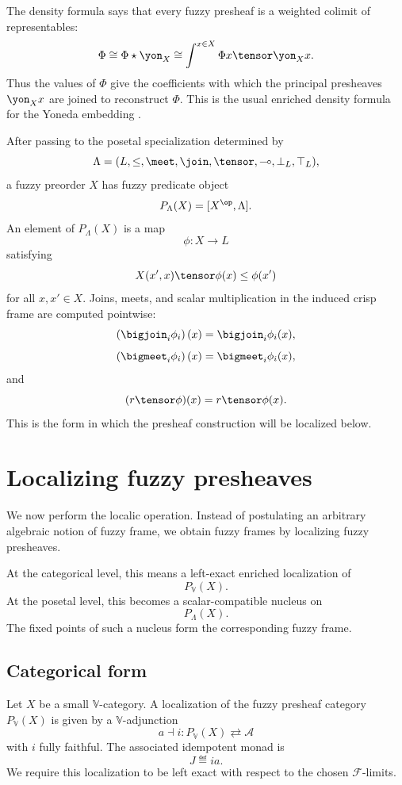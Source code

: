 The density formula says that every fuzzy presheaf is a weighted colimit of
representables:
\[
    \Phi
    \cong
    \Phi\star\yon_X
    \cong
    \int^{x\in X}\Phi x\tensor\yon_Xx.
\]
Thus the values of \(\Phi\) give the coefficients with which the principal presheaves
\(\yon_Xx\) are joined to reconstruct \(\Phi\). This is the usual enriched density
formula for the Yoneda embedding \cite{Kelly1982BasicConcepts}.

After passing to the posetal specialization determined by
\[
    \Lambda=(L,\leq,\meet,\join,\tensor,\multimap,\bot_L,\top_L),
\]
a fuzzy preorder \(X\) has fuzzy predicate object
\[
    P_\Lambda(X)
    =
    [X^{\op},\Lambda].
\]
An element of \(P_\Lambda(X)\) is a map
\[
    \phi:X\to L
\]
satisfying
\[
    X(x',x)\tensor\phi(x)\leq \phi(x')
\]
for all \(x,x'\in X\). Joins, meets, and scalar multiplication in the induced crisp
frame are computed pointwise:
\[
    \left(\bigjoin_i\phi_i\right)(x)
    =
    \bigjoin_i\phi_i(x),
\]
\[
    \left(\bigmeet_i\phi_i\right)(x)
    =
    \bigmeet_i\phi_i(x),
\]
and
\[
    (r\tensor\phi)(x)
    =
    r\tensor\phi(x).
\]
This is the form in which the presheaf construction will be localized below.

\section{Localizing fuzzy presheaves}
\label{sec:localizing-fuzzy-presheaves}

We now perform the localic operation. Instead of postulating an arbitrary algebraic
notion of fuzzy frame, we obtain fuzzy frames by localizing fuzzy presheaves.

At the categorical level, this means a left-exact enriched localization of
\[
    P_{\mathbb V}(X).
\]
At the posetal level, this becomes a scalar-compatible nucleus on
\[
    P_\Lambda(X).
\]
The fixed points of such a nucleus form the corresponding fuzzy frame.

\subsection{Categorical form}
\label{subsec:localizing-presheaves-categorical-form}

Let \(X\) be a small \(\mathbb V\)-category. A localization of the fuzzy presheaf
category \(P_{\mathbb V}(X)\) is given by a \(\mathbb V\)-adjunction
\[
    a\dashv i:
    P_{\mathbb V}(X)\rightleftarrows \mathcal A
\]
with \(i\) fully faithful. The associated idempotent monad is
\[
    J\eqdef ia.
\]
We require this localization to be left exact with respect to the chosen
\(\mathcal F\)-limits.

